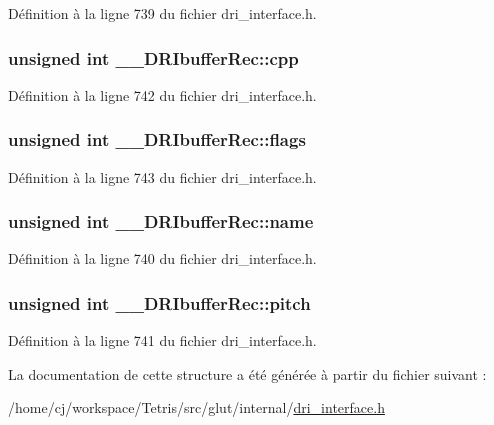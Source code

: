 Définition à la ligne 739 du fichier dri\-\_\-interface.\-h.

\hypertarget{struct_____d_r_ibuffer_rec_ae4229532ca9a93caf4e3a548d2591255}{
\subsubsection[{cpp}]{\setlength{\rightskip}{0pt plus 5cm}unsigned int \-\_\-\-\_\-\-D\-R\-Ibuffer\-Rec\-::cpp}}\label{struct_____d_r_ibuffer_rec_ae4229532ca9a93caf4e3a548d2591255}


Définition à la ligne 742 du fichier dri\-\_\-interface.\-h.

\hypertarget{struct_____d_r_ibuffer_rec_ab0bf0cf0495bc1d86b152b9236245c06}{
\subsubsection[{flags}]{\setlength{\rightskip}{0pt plus 5cm}unsigned int \-\_\-\-\_\-\-D\-R\-Ibuffer\-Rec\-::flags}}\label{struct_____d_r_ibuffer_rec_ab0bf0cf0495bc1d86b152b9236245c06}


Définition à la ligne 743 du fichier dri\-\_\-interface.\-h.

\hypertarget{struct_____d_r_ibuffer_rec_a7b6270c8073fcd89d9c1f0a2e1484a55}{
\subsubsection[{name}]{\setlength{\rightskip}{0pt plus 5cm}unsigned int \-\_\-\-\_\-\-D\-R\-Ibuffer\-Rec\-::name}}\label{struct_____d_r_ibuffer_rec_a7b6270c8073fcd89d9c1f0a2e1484a55}


Définition à la ligne 740 du fichier dri\-\_\-interface.\-h.

\hypertarget{struct_____d_r_ibuffer_rec_a3ca39b391b5c70991eceecfe24680d01}{
\subsubsection[{pitch}]{\setlength{\rightskip}{0pt plus 5cm}unsigned int \-\_\-\-\_\-\-D\-R\-Ibuffer\-Rec\-::pitch}}\label{struct_____d_r_ibuffer_rec_a3ca39b391b5c70991eceecfe24680d01}


Définition à la ligne 741 du fichier dri\-\_\-interface.\-h.



La documentation de cette structure a été générée à partir du fichier suivant \-:\begin{DoxyCompactItemize}
\item 
/home/cj/workspace/\-Tetris/src/glut/internal/\hyperlink{dri__interface_8h}{dri\-\_\-interface.\-h}\end{DoxyCompactItemize}
